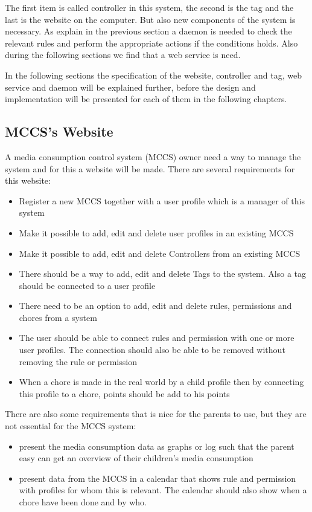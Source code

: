 The first item is called controller in this system, the second is the tag and the last is the website on the computer. But also new components of the system is necessary. As explain in the previous section a daemon is needed to check the relevant rules and perform the appropriate actions if the conditions holds. Also during the following sections we find that a web service is need. 

In the following sections the specification of the website, controller and tag, web service and daemon will be explained further, before the design and implementation will be presented for each of them in the following chapters.  

\subsection{MCCS's Website}
A media consumption control system (MCCS) owner need a way to manage the system and for this a website will be made. There are several requirements for this website:

\begin{itemize}
	\item Register a new MCCS together with a user profile which is a manager of this system
	\item Make it possible to add, edit and delete user profiles in an existing MCCS 
	\item Make it possible to add, edit and delete Controllers from an existing MCCS
	\item There should be a way to add, edit and delete Tags to the system. Also a tag should be connected to a user profile
	\item There need to be an option to add, edit and delete rules, permissions and chores from a system
	\item The user should be able to connect rules and permission with one or more user profiles. The connection should also be able to be removed without removing the rule or permission
	\item When a chore is made in the real world by a child profile then by connecting this profile to a chore, points should be add to his points
\end{itemize}

There are also some requirements that is nice for the parents to use, but they are not essential for the MCCS system:

\begin{itemize}
	\item present the media consumption data as graphs or log such that the parent easy can get an overview of their children's media consumption 
	\item present data from the MCCS in a calendar that shows rule and permission with profiles for whom this is relevant. The calendar should also show when a chore have been done and by who.
\end{itemize}

